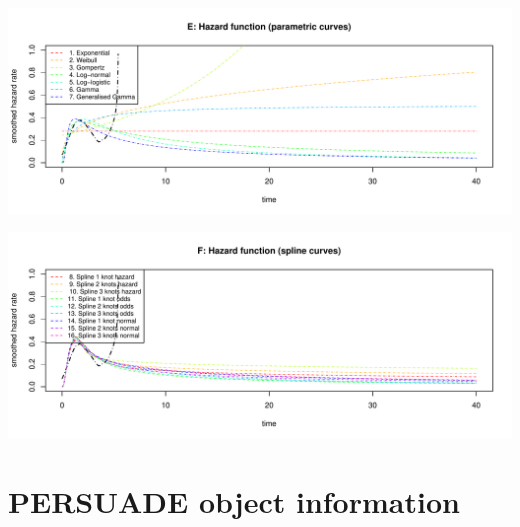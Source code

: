 \documentclass[
]{article}
\begin{document}
\begin{flushleft}\includegraphics[height=0.29\textheight]{Images/validate_extrapolation3-5} \end{flushleft}

\begin{flushleft}\includegraphics[height=0.29\textheight]{Images/validate_extrapolation3-6} \end{flushleft}

\newpage

\hypertarget{persuade-object-information}{%
\section{PERSUADE object
information}\label{persuade-object-information}}
\end{document}
